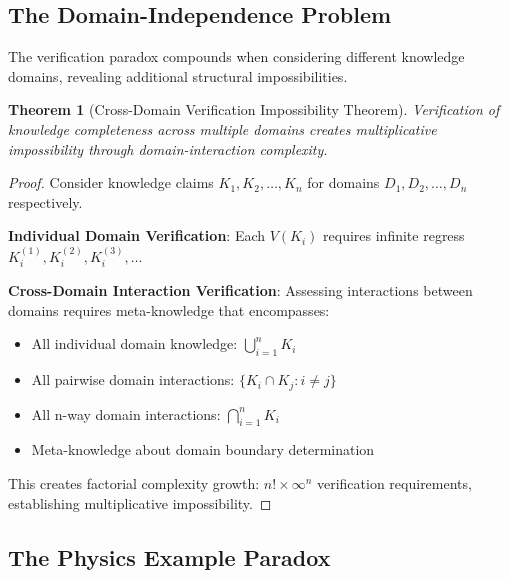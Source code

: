\documentclass[12pt,a4paper]{article}
\newtheorem{theorem}{Theorem}[section]
\begin{document}
\subsection{The Domain-Independence Problem}

The verification paradox compounds when considering different knowledge domains, revealing additional structural impossibilities.

\begin{theorem}[Cross-Domain Verification Impossibility Theorem]
Verification of knowledge completeness across multiple domains creates multiplicative impossibility through domain-interaction complexity.
\end{theorem}

\begin{proof}
Consider knowledge claims $K_1, K_2, \ldots, K_n$ for domains $D_1, D_2, \ldots, D_n$ respectively.

\textbf{Individual Domain Verification}: Each $V(K_i)$ requires infinite regress $K_i^{(1)}, K_i^{(2)}, K_i^{(3)}, \ldots$

\textbf{Cross-Domain Interaction Verification}: Assessing interactions between domains requires meta-knowledge that encompasses:
\begin{itemize}
\item All individual domain knowledge: $\bigcup_{i=1}^{n} K_i$
\item All pairwise domain interactions: $\{K_i \cap K_j : i \neq j\}$
\item All n-way domain interactions: $\bigcap_{i=1}^{n} K_i$
\item Meta-knowledge about domain boundary determination
\end{itemize}

This creates factorial complexity growth: $n! \times \infty^n$ verification requirements, establishing multiplicative impossibility.
\end{proof}

\subsection{The Physics Example Paradox}
\end{document}
